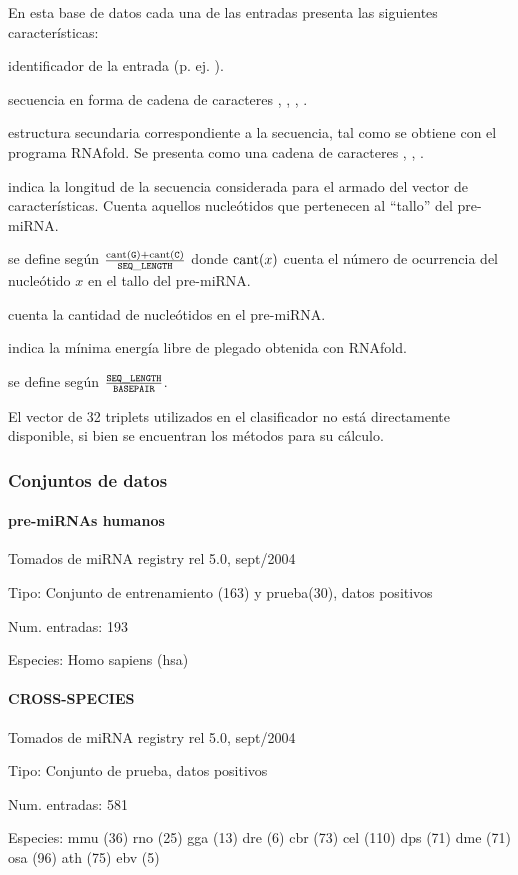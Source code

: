 \documentclass[12pt,bibliography=openstyle,DIV=12,parskip=half-]{scrartcl}
\begin{document}
En esta base de datos cada una de las entradas presenta las siguientes
características:
\begin{description*}
%
\item[identificador] de la entrada (p. ej. ).
%
\item[secuencia] en forma de cadena de caracteres , ,
  , .
%
\item[estructura secundaria] correspondiente a la secuencia, tal como
  se obtiene con el programa RNAfold\cite{vienna}. Se presenta como
  una cadena de caracteres \mono{(}, , \mono{)}.
%
\item[\mono{SEQ\_LENGTH}] indica la longitud de la secuencia
  considerada para el armado del vector de características. Cuenta
  aquellos nucleótidos que pertenecen al ``tallo'' del pre-miRNA.
%
\item[\mono{GC\_CONTENT}] se define según
  $\frac{\textrm{cant}({\tt G})+\textrm{cant}({\tt C})}{{\tt SEQ\_LENGTH}}$
  donde $\textrm{cant}(x)$ cuenta el número de ocurrencia del nucleótido
  $x$ en el tallo del pre-miRNA.
%
\item[\mono{BASEPAIR}] cuenta la cantidad de nucleótidos
   en el pre-miRNA.
%
\item[\mono{FREE\_ENERGY}] indica la mínima energía libre de plegado
  obtenida con RNAfold.
%
\item[\mono{LEN\_BP\_RATIO}] se define según
  $\frac{{\tt SEQ\_LENGTH}}{{\tt BASEPAIR}}$.
\end{description*}
%
El vector de 32 triplets utilizados en el clasificador no está
directamente disponible, si bien se encuentran los métodos para su
cálculo.
%
\subsubsection{Conjuntos de datos}
\paragraph{pre-miRNAs humanos}
Tomados de miRNA registry rel 5.0, sept/2004
\begin{description*}
\item[Tipo:] Conjunto de entrenamiento (163) y prueba(30), datos
  positivos
\item[Num. entradas:] 193
\item[Especies:] Homo sapiens (hsa)
\end{description*}
\paragraph{CROSS-SPECIES}
Tomados de miRNA registry rel 5.0, sept/2004
\begin{description*}
\item[Tipo:] Conjunto de prueba, datos positivos
\item[Num. entradas:] 581
\item[Especies:]
  \quad mmu (36)
  \quad rno (25)
  \quad gga (13)
  \quad dre (6)
  \quad cbr (73)
  \quad cel (110)
  \quad dps (71)
  \quad dme (71)
  \quad osa (96)
  \quad ath (75)
  \quad ebv (5)
\end{description*}
%
\end{document}
